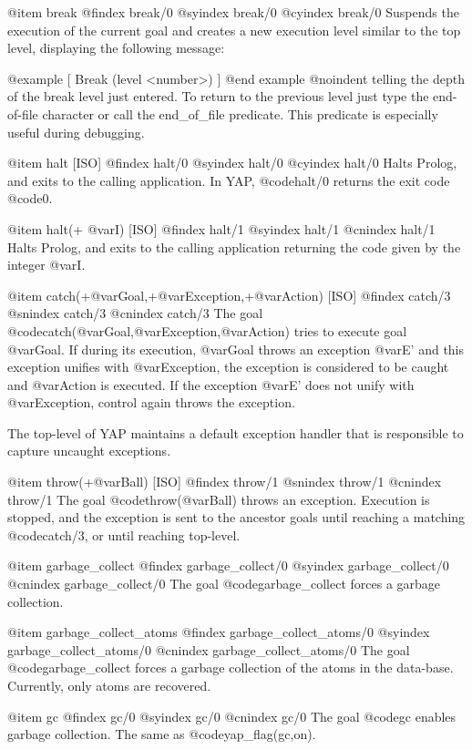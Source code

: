 {{{{@item break
@findex break/0
@syindex break/0
@cyindex break/0
Suspends the execution of the current goal and creates a new execution
level similar to the top level, displaying the following message:

@example
 [ Break (level <number>) ]
@end example
@noindent
telling the depth of the break level just entered. To return to the
previous level just type the end-of-file character or call the
end_of_file predicate.  This predicate is especially useful during
debugging.

@item halt [ISO]
@findex halt/0
@syindex halt/0
@cyindex halt/0
Halts Prolog, and exits to the calling application. In YAP,
@code{halt/0} returns the exit code @code{0}.

@item halt(+ @var{I}) [ISO]
@findex halt/1
@syindex halt/1
@cnindex halt/1
Halts Prolog, and exits to the calling application returning the code
given by the integer @var{I}.

@item catch(+@var{Goal},+@var{Exception},+@var{Action}) [ISO]
@findex catch/3
@snindex catch/3
@cnindex catch/3
The goal @code{catch(@var{Goal},@var{Exception},@var{Action})} tries to
execute goal @var{Goal}. If during its execution, @var{Goal} throws an
exception @var{E'} and this exception unifies with @var{Exception}, the
exception is considered to be caught and @var{Action} is executed. If
the exception @var{E'} does not unify with @var{Exception}, control
again throws the exception.

The top-level of YAP maintains a default exception handler that
is responsible to capture uncaught exceptions.

@item throw(+@var{Ball}) [ISO]
@findex throw/1
@snindex throw/1
@cnindex throw/1
The goal @code{throw(@var{Ball})} throws an exception. Execution is
stopped, and the exception is sent to the ancestor goals until reaching
a matching @code{catch/3}, or until reaching top-level.

@item garbage_collect
@findex garbage_collect/0
@syindex garbage_collect/0
@cnindex garbage_collect/0
The goal @code{garbage_collect} forces a garbage collection.

@item garbage_collect_atoms
@findex garbage_collect_atoms/0
@syindex garbage_collect_atoms/0
@cnindex garbage_collect_atoms/0
The goal @code{garbage_collect} forces a garbage collection of the atoms
in the data-base. Currently, only atoms are recovered.

@item gc
@findex gc/0
@syindex gc/0
@cnindex gc/0
The goal @code{gc} enables garbage collection. The same as
@code{yap_flag(gc,on)}.

}}}}
